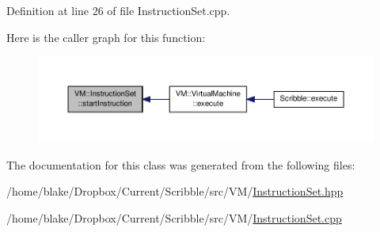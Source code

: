 Definition at line 26 of file Instruction\-Set.\-cpp.



Here is the caller graph for this function\-:
\nopagebreak
\begin{figure}[H]
\begin{center}
\leavevmode
\includegraphics[width=350pt]{class_v_m_1_1_instruction_set_a25b73973708552f8fa9b9085345275d9_icgraph}
\end{center}
\end{figure}




The documentation for this class was generated from the following files\-:\begin{DoxyCompactItemize}
\item 
/home/blake/\-Dropbox/\-Current/\-Scribble/src/\-V\-M/\hyperlink{_instruction_set_8hpp}{Instruction\-Set.\-hpp}\item 
/home/blake/\-Dropbox/\-Current/\-Scribble/src/\-V\-M/\hyperlink{_instruction_set_8cpp}{Instruction\-Set.\-cpp}\end{DoxyCompactItemize}
